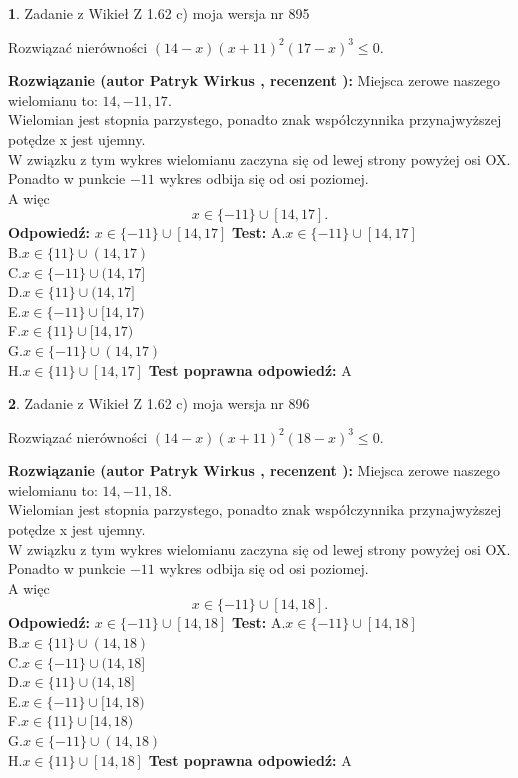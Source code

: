 \documentclass[12pt, a4paper]{article}
\theoremstyle{definition} %
\newtheorem{zad}{}
\newcommand{\zadStart}[1]{\begin{zad}#1\newline}
\newcommand{\zadStop}{\end{zad}}
\newcommand{\rozwStart}[2]{\noindent \textbf{Rozwiązanie (autor #1 , recenzent #2): }\newline}
\newcommand{\rozwStop}{\newline}
\newcommand{\odpStart}{\noindent \textbf{Odpowiedź:}\newline}
\newcommand{\odpStop}{\newline}
\newcommand{\testStart}{\noindent \textbf{Test:}\newline}
\newcommand{\testStop}{\newline}
\newcommand{\kluczStart}{\noindent \textbf{Test poprawna odpowiedź:}\newline}
\newcommand{\kluczStop}{\newline}
\begin{document}
\zadStart{Zadanie z Wikieł Z 1.62 c) moja wersja nr 895}

Rozwiązać nierówności $(14-x)(x+11)^{2}(17-x)^{3}\le0$.
\zadStop
\rozwStart{Patryk Wirkus}{}
Miejsca zerowe naszego wielomianu to: $14, -11, 17$.\\
Wielomian jest stopnia parzystego, ponadto znak współczynnika przy\linebreak najwyższej potędze x jest ujemny.\\ W związku z tym wykres wielomianu zaczyna się od lewej strony powyżej osi OX.\\
Ponadto w punkcie $-11$ wykres odbija się od osi poziomej.\\
A więc $$x \in \{-11\} \cup [14,17].$$
\rozwStop
\odpStart
$x \in \{-11\} \cup [14,17]$
\odpStop
\testStart
A.$x \in \{-11\} \cup [14,17]$\\
B.$x \in \{11\} \cup (14,17)$\\
C.$x \in \{-11\} \cup (14,17]$\\
D.$x \in \{11\} \cup (14,17]$\\
E.$x \in \{-11\} \cup [14,17)$\\
F.$x \in \{11\} \cup [14,17)$\\
G.$x \in \{-11\} \cup (14,17)$\\
H.$x \in \{11\} \cup [14,17]$
\testStop
\kluczStart
A
\kluczStop



\zadStart{Zadanie z Wikieł Z 1.62 c) moja wersja nr 896}

Rozwiązać nierówności $(14-x)(x+11)^{2}(18-x)^{3}\le0$.
\zadStop
\rozwStart{Patryk Wirkus}{}
Miejsca zerowe naszego wielomianu to: $14, -11, 18$.\\
Wielomian jest stopnia parzystego, ponadto znak współczynnika przy\linebreak najwyższej potędze x jest ujemny.\\ W związku z tym wykres wielomianu zaczyna się od lewej strony powyżej osi OX.\\
Ponadto w punkcie $-11$ wykres odbija się od osi poziomej.\\
A więc $$x \in \{-11\} \cup [14,18].$$
\rozwStop
\odpStart
$x \in \{-11\} \cup [14,18]$
\odpStop
\testStart
A.$x \in \{-11\} \cup [14,18]$\\
B.$x \in \{11\} \cup (14,18)$\\
C.$x \in \{-11\} \cup (14,18]$\\
D.$x \in \{11\} \cup (14,18]$\\
E.$x \in \{-11\} \cup [14,18)$\\
F.$x \in \{11\} \cup [14,18)$\\
G.$x \in \{-11\} \cup (14,18)$\\
H.$x \in \{11\} \cup [14,18]$
\testStop
\kluczStart
A
\kluczStop
\end{document}
